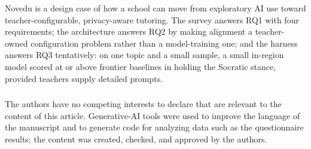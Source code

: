 \documentclass[runningheads]{llncs}
\begin{document}
Novedu is a design case of how a school can move from exploratory AI use toward teacher-configurable, privacy-aware tutoring. The survey answers RQ1 with four requirements; the architecture answers RQ2 by making alignment a teacher-owned configuration problem rather than a model-training one; and the harness answers RQ3 tentatively: on one topic and a small sample, a small in-region model scored at or above frontier baselines in holding the Socratic stance, provided teachers supply detailed prompts.

\begin{credits}
\subsubsection{\discintname} The authors have no competing interests to declare that are relevant to the content of this article. Generative-AI tools were used to improve the language of the manuscript and to generate code for analyzing data such as the questionnaire results; the content was created, checked, and approved by the authors.
\end{credits}



\end{document}
